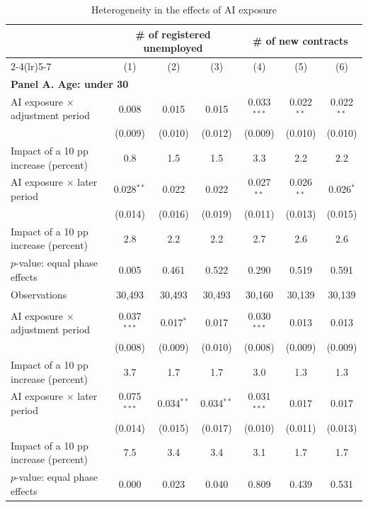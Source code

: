 \begin{table}[p]
\centering
\caption{Heterogeneity in the effects of AI exposure}
\label{tab:v1_heterogeneity}
\begin{threeparttable}
\scriptsize
\renewcommand{\arraystretch}{0.84}
\setlength{\tabcolsep}{3.0pt}
\begin{tabular}{@{}lcccccc@{}}
\toprule
& \multicolumn{3}{c}{\# of registered unemployed} & \multicolumn{3}{c}{\# of new contracts} \\
\cmidrule(lr){2-4}\cmidrule(lr){5-7}
& (1) & (2) & (3) & (4) & (5) & (6) \\
\midrule
\multicolumn{7}{l}{\textbf{Panel A. Age: under 30}} \\
AI exposure $\times$ adjustment period & 0.008 & 0.015 & 0.015 & 0.033$^{***}$ & 0.022$^{**}$ & 0.022$^{**}$ \\
 & (0.009) & (0.010) & (0.012) & (0.009) & (0.010) & (0.010) \\
Impact of a 10 pp increase (percent) & 0.8 & 1.5 & 1.5 & 3.3 & 2.2 & 2.2 \\
\addlinespace
AI exposure $\times$ later period & 0.028$^{**}$ & 0.022 & 0.022 & 0.027$^{**}$ & 0.026$^{**}$ & 0.026$^{*}$ \\
 & (0.014) & (0.016) & (0.019) & (0.011) & (0.013) & (0.015) \\
Impact of a 10 pp increase (percent) & 2.8 & 2.2 & 2.2 & 2.7 & 2.6 & 2.6 \\
$p$-value: equal phase effects & 0.005 & 0.461 & 0.522 & 0.290 & 0.519 & 0.591 \\
Observations & 30,493 & 30,493 & 30,493 & 30,160 & 30,139 & 30,139 \\
\addlinespace[1pt]
\multicolumn{7}{l}{\textbf{Panel B. Age: 30--39}} \\
AI exposure $\times$ adjustment period & 0.037$^{***}$ & 0.017$^{*}$ & 0.017 & 0.030$^{***}$ & 0.013 & 0.013 \\
 & (0.008) & (0.009) & (0.010) & (0.008) & (0.009) & (0.009) \\
Impact of a 10 pp increase (percent) & 3.7 & 1.7 & 1.7 & 3.0 & 1.3 & 1.3 \\
\addlinespace
AI exposure $\times$ later period & 0.075$^{***}$ & 0.034$^{**}$ & 0.034$^{**}$ & 0.031$^{***}$ & 0.017 & 0.017 \\
 & (0.014) & (0.015) & (0.017) & (0.010) & (0.011) & (0.013) \\
Impact of a 10 pp increase (percent) & 7.5 & 3.4 & 3.4 & 3.1 & 1.7 & 1.7 \\
$p$-value: equal phase effects & 0.000 & 0.023 & 0.040 & 0.809 & 0.439 & 0.531 \\

\end{tabular}
\end{threeparttable}
\end{table}
